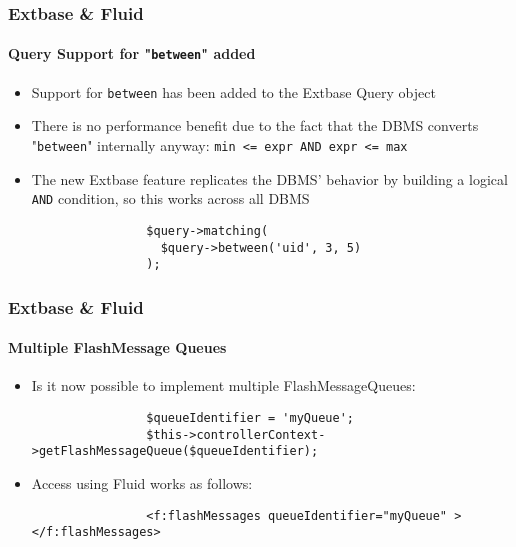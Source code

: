 \begin{frame}[fragile]
	\frametitle{Extbase \& Fluid}
	\framesubtitle{Query Support for "\texttt{between}" added}

	\begin{itemize}

		\item Support for \texttt{between} has been added to the Extbase Query object

		\item There is no performance benefit due to the fact that the DBMS converts
			"\texttt{between}" internally anyway: \texttt{min <= expr AND expr <= max}

		\item The new Extbase feature replicates the DBMS' behavior by building a logical
			\texttt{AND} condition, so this works across all DBMS

			\begin{lstlisting}
				$query->matching(
				  $query->between('uid', 3, 5)
				);
			\end{lstlisting}

	\end{itemize}

\end{frame}


\begin{frame}[fragile]
	\frametitle{Extbase \& Fluid}
	\framesubtitle{Multiple FlashMessage Queues}

	\begin{itemize}

		\item Is it now possible to implement multiple FlashMessageQueues:

			\begin{lstlisting}
				$queueIdentifier = 'myQueue';
				$this->controllerContext->getFlashMessageQueue($queueIdentifier);
			\end{lstlisting}

		\item Access using Fluid works as follows:

			\begin{lstlisting}
				<f:flashMessages queueIdentifier="myQueue" ></f:flashMessages>
			\end{lstlisting}

	\end{itemize}

\end{frame}

